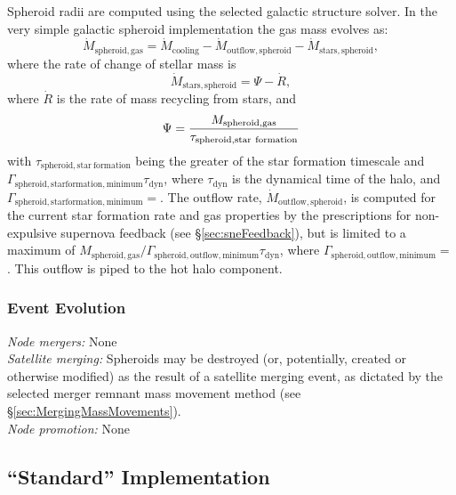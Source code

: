 Spheroid radii are computed using the selected galactic structure solver. In the very simple galactic spheroid implementation the gas mass evolves as:
\begin{equation}
 \dot{M}_\mathrm{spheroid, gas} = \dot{M}_\mathrm{cooling} - \dot{M}_\mathrm{outflow, spheroid} - \dot{M}_\mathrm{stars, spheroid},
\end{equation}
where the rate of change of stellar mass is
\begin{equation}
 \dot{M}_\mathrm{stars, spheroid} = \Psi - \dot{R},
\end{equation}
where $\dot{R}$ is the rate of mass recycling from stars, and
\begin{equation}
 \Psi = {M_\mathrm{spheroid, gas} \over \tau_\mathrm{spheroid, star~formation}}
\end{equation}
with $\tau_\mathrm{spheroid, star~formation}$ being the greater of the star formation timescale and $\Gamma_\mathrm{spheroid, star formation, minimum} \tau_\mathrm{dyn}$, where $\tau_\mathrm{dyn}$ is the dynamical time of the halo, and $\Gamma_\mathrm{spheroid, star formation, minimum}=${\normalfont \ttfamily [spheroidStarFormationTimescaleMinimum]}. The outflow rate, $\dot{M}_\mathrm{outflow, spheroid}$, is computed for the current star formation rate and gas properties by the prescriptions for non-expulsive supernova feedback (see \S\ref{sec:sneFeedback}), but is limited to a maximum of $M_\mathrm{spheroid, gas}/ \Gamma_\mathrm{spheroid, outflow, minimum} \tau_\mathrm{dyn}$, where $\Gamma_\mathrm{spheroid, outflow, minimum}=${\normalfont \ttfamily [spheroidOutflowTimescaleMinimum]}. This outflow is piped to the hot halo component.

\subsubsection{Event Evolution}

\noindent\emph{Node mergers:} None\\

\noindent\emph{Satellite merging:} Spheroids may be destroyed (or, potentially, created or otherwise modified) as the result of a satellite merging event, as dictated by the selected merger remnant mass movement method (see \S\ref{sec:MergingMassMovements}).\\

\noindent\emph{Node promotion:} None\\

\subsection{``Standard'' Implementation}

